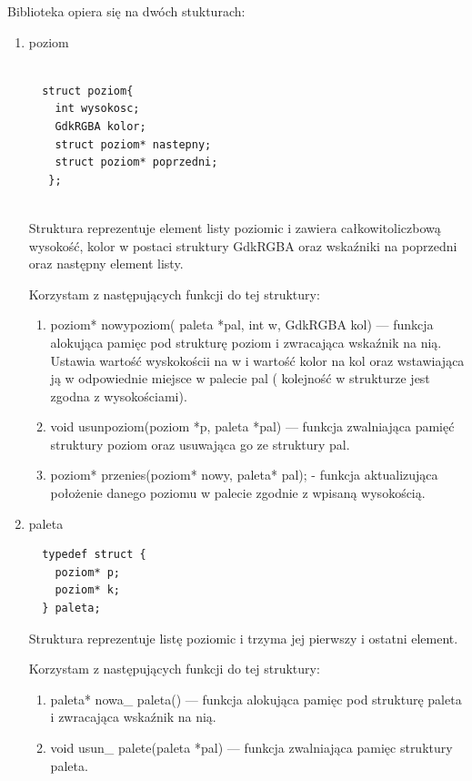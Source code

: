 \documentclass[a4paper]{article}
\begin{document}
 Biblioteka opiera się na dwóch stukturach:
  \begin{enumerate}
  \item{poziom}
  \begin{lstlisting}
  
  struct poziom{
    int wysokosc;
    GdkRGBA kolor;
    struct poziom* nastepny;
    struct poziom* poprzedni;
   };
  
  \end{lstlisting}
  Struktura reprezentuje element listy poziomic i zawiera całkowitoliczbową wysokość, kolor w postaci struktury GdkRGBA oraz wskaźniki na poprzedni oraz następny element listy.
  
   Korzystam z następujących funkcji do tej struktury:
   \begin{enumerate}   
   
  \item{poziom* nowy\textunderscore poziom( paleta *pal,  int w, GdkRGBA kol)} --- funkcja alokująca pamięc pod strukturę poziom i zwracająca wskaźnik na nią. Ustawia wartość wyskokościi na w i wartość kolor na kol oraz wstawiająca ją w odpowiednie miejsce w palecie pal ( kolejność w strukturze jest zgodna z wysokościami).
  
  \item{void usun\textunderscore poziom(poziom *p, paleta *pal)} --- funkcja zwalniająca pamięć struktury poziom oraz usuwająca go ze struktury pal.
  
  \item{poziom* przenies(poziom* nowy, paleta* pal);} - funkcja aktualizująca położenie danego poziomu w palecie zgodnie z wpisaną wysokością.
  
  
  \end{enumerate}
  \item{paleta}
  \begin{lstlisting}
  typedef struct {
    poziom* p; 
    poziom* k;
  } paleta;  
  \end{lstlisting}  
  Struktura reprezentuje listę poziomic i trzyma jej pierwszy i ostatni element.
  
  Korzystam z następujących funkcji do tej struktury:
  \begin{enumerate}
  \item{paleta* nowa\_ paleta()} --- funkcja alokująca pamięc pod strukturę paleta i zwracająca wskaźnik na nią.
  
  \item{void usun\_ palete(paleta *pal)} --- funkcja zwalniająca pamięc struktury paleta.
   

\end{enumerate}
\end{enumerate}
\end{document}
